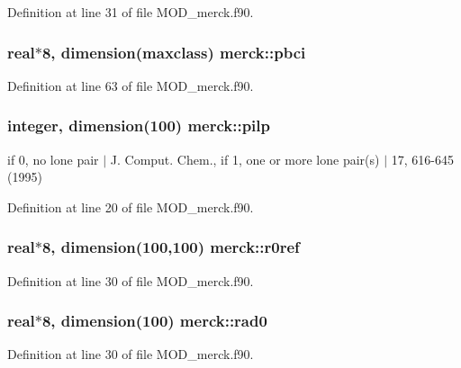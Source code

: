 Definition at line 31 of file M\-O\-D\-\_\-merck.\-f90.

\hypertarget{classmerck_aa1c153c0ae05993c88c4ea273ad5650e}{
\subsubsection[{pbci}]{\setlength{\rightskip}{0pt plus 5cm}real$\ast$8, dimension(maxclass) merck\-::pbci}}\label{classmerck_aa1c153c0ae05993c88c4ea273ad5650e}


Definition at line 63 of file M\-O\-D\-\_\-merck.\-f90.

\hypertarget{classmerck_ac3a6272c62f8f3e04549ad11b9ee9033}{
\subsubsection[{pilp}]{\setlength{\rightskip}{0pt plus 5cm}integer, dimension(100) merck\-::pilp}}\label{classmerck_ac3a6272c62f8f3e04549ad11b9ee9033}


if 0, no lone pair $|$ J. Comput. Chem., if 1, one or more lone pair(s) $|$ 17, 616-\/645 (1995) 



Definition at line 20 of file M\-O\-D\-\_\-merck.\-f90.

\hypertarget{classmerck_a74fb8d2edab6da02dff237cadce84dc1}{
\subsubsection[{r0ref}]{\setlength{\rightskip}{0pt plus 5cm}real$\ast$8, dimension(100,100) merck\-::r0ref}}\label{classmerck_a74fb8d2edab6da02dff237cadce84dc1}


Definition at line 30 of file M\-O\-D\-\_\-merck.\-f90.

\hypertarget{classmerck_a0d1de87ac7a02686e788c3d0bc717928}{
\subsubsection[{rad0}]{\setlength{\rightskip}{0pt plus 5cm}real$\ast$8, dimension(100) merck\-::rad0}}\label{classmerck_a0d1de87ac7a02686e788c3d0bc717928}


Definition at line 30 of file M\-O\-D\-\_\-merck.\-f90.

